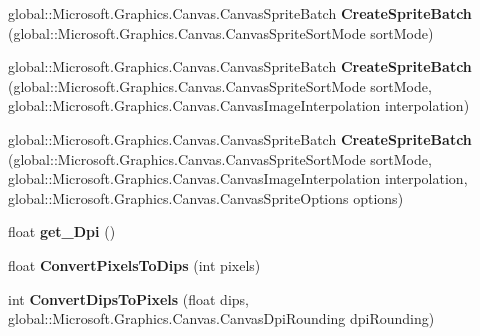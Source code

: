 \begin{DoxyCompactItemize}
global\+::\+Microsoft.\+Graphics.\+Canvas.\+Canvas\+Sprite\+Batch {\bfseries Create\+Sprite\+Batch} (global\+::\+Microsoft.\+Graphics.\+Canvas.\+Canvas\+Sprite\+Sort\+Mode sort\+Mode)
\item 
\mbox{\label{class_microsoft_1_1_graphics_1_1_canvas_1_1_canvas_drawing_session_af03c7fa9272225a4aa04141c79381dbe}} 
global\+::\+Microsoft.\+Graphics.\+Canvas.\+Canvas\+Sprite\+Batch {\bfseries Create\+Sprite\+Batch} (global\+::\+Microsoft.\+Graphics.\+Canvas.\+Canvas\+Sprite\+Sort\+Mode sort\+Mode, global\+::\+Microsoft.\+Graphics.\+Canvas.\+Canvas\+Image\+Interpolation interpolation)
\item 
\mbox{\label{class_microsoft_1_1_graphics_1_1_canvas_1_1_canvas_drawing_session_a4a164e8f14dacae16a1a20511ade806d}} 
global\+::\+Microsoft.\+Graphics.\+Canvas.\+Canvas\+Sprite\+Batch {\bfseries Create\+Sprite\+Batch} (global\+::\+Microsoft.\+Graphics.\+Canvas.\+Canvas\+Sprite\+Sort\+Mode sort\+Mode, global\+::\+Microsoft.\+Graphics.\+Canvas.\+Canvas\+Image\+Interpolation interpolation, global\+::\+Microsoft.\+Graphics.\+Canvas.\+Canvas\+Sprite\+Options options)
\item 
\mbox{\label{class_microsoft_1_1_graphics_1_1_canvas_1_1_canvas_drawing_session_aa494d5f2ded4d6e3d804b293b5f8cec3}} 
float {\bfseries get\+\_\+\+Dpi} ()
\item 
\mbox{\label{class_microsoft_1_1_graphics_1_1_canvas_1_1_canvas_drawing_session_a3d874cf93ca10e468bf997537c2d5e78}} 
float {\bfseries Convert\+Pixels\+To\+Dips} (int pixels)
\item 
\mbox{\label{class_microsoft_1_1_graphics_1_1_canvas_1_1_canvas_drawing_session_ae35be92d0924e7e196ebfad854028d39}} 
int {\bfseries Convert\+Dips\+To\+Pixels} (float dips, global\+::\+Microsoft.\+Graphics.\+Canvas.\+Canvas\+Dpi\+Rounding dpi\+Rounding)
\item 
\mbox{\label{class_microsoft_1_1_graphics_1_1_canvas_1_1_canvas_drawing_session_a057ff80ae9eefd6516a3b0ed65388494}} 

\end{DoxyCompactItemize}

